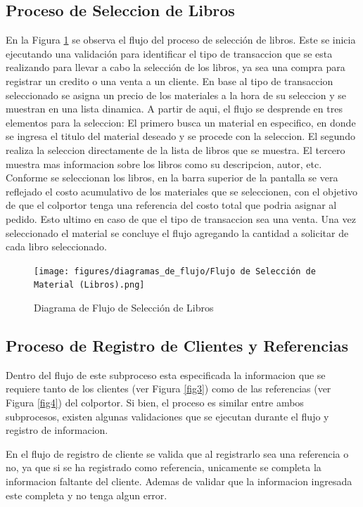 \documentclass[runningheads]{llncs}
\begin{document}
\subsection*{Proceso de Seleccion de Libros}
En la Figura \ref{fig2} se observa el flujo del proceso de selección de libros.
Este se inicia ejecutando una validación para identificar el tipo de transaccion que se esta realizando para llevar a cabo la selección de los libros, ya sea una compra para registrar un credito o una venta a un cliente.
En base al tipo de transaccion seleccionado se asigna un precio de los materiales a la hora de su seleccion y se muestran en una lista dinamica.
A partir de aqui, el flujo se desprende en tres elementos para la seleccion: El primero busca un material en especifico, en donde se ingresa el titulo del material deseado y se procede con la seleccion. El segundo realiza la seleccion directamente de la lista de libros que se muestra. El tercero muestra mas informacion sobre los libros como su descripcion, autor, etc.
Conforme se seleccionan los libros, en la barra superior de la pantalla se vera reflejado el costo acumulativo de los materiales que se seleccionen, con el objetivo de que el colportor tenga una referencia del costo total que podria asignar al pedido. Esto ultimo en caso de que el tipo de transaccion sea una venta.
Una vez seleccionado el material se concluye el flujo agregando la cantidad a solicitar de cada libro seleccionado.
\begin{figure}[H]
	\centering\captionsetup{width=0.8\textwidth}
	\texttt{[image: figures/diagramas\_de\_flujo/Flujo de Selección de Material (Libros).png]}
	\caption{Diagrama de Flujo de Selección de Libros} \label{fig2}
\end{figure}


\subsection*{Proceso de Registro de Clientes y Referencias}
Dentro del flujo de este subproceso esta especificada la informacion que se requiere tanto de los clientes (ver Figura \ref{fig3}) como de las referencias (ver Figura \ref{fig4}) del colportor.
Si bien, el proceso es similar entre ambos subprocesos, existen algunas validaciones que se ejecutan durante el flujo y registro de informacion.

En el flujo de registro de cliente se valida que al registrarlo sea una referencia o no, ya que si se ha registrado como referencia, unicamente se completa la informacion faltante del cliente. 
Ademas de validar que la informacion ingresada este completa y no tenga algun error.
\end{document}

